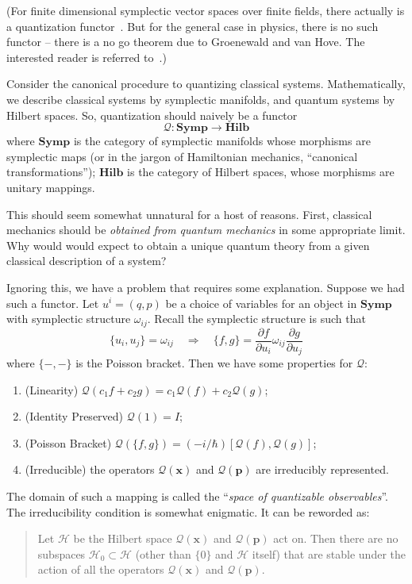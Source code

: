 (For finite dimensional symplectic vector spaces over finite
fields, there actually is a quantization
functor~\cite{gurevich-2007}. But for the general case in
physics, there is no such functor -- there is a no go theorem due
to Groenewald and van Hove. The interested reader is referred to~\cite{ali-2005-17,gotay-1996-6}.)

Consider the canonical procedure to quantizing classical
systems. Mathematically, we describe classical systems by
symplectic manifolds, and quantum systems by Hilbert spaces. So,
quantization should naively be a functor
\begin{equation}%
\mathcal{Q}:\mathbf{Symp}\to\mathbf{Hilb}
\end{equation}
where $\mathbf{Symp}$ is the category of symplectic manifolds whose
morphisms are symplectic maps (or in the jargon of Hamiltonian
mechanics, ``canonical transformations''); $\mathbf{Hilb}$ is the
category of Hilbert spaces, whose morphisms are unitary mappings.

This should seem somewhat unnatural for a host of reasons. First,
classical mechanics should be \emph{obtained from quantum mechanics} 
in some appropriate limit. Why would would expect to obtain a
unique quantum theory from a given classical description of a
system? 

Ignoring this, we have a problem that requires some
explanation. Suppose we had such a functor. Let $u^{i}=(q,p)$ be
a choice of variables for an object in $\mathbf{Symp}$ with
symplectic structure $\omega_{ij}$. Recall the symplectic
structure is such that
\begin{equation}%
\{u_i,u_j\}=\omega_{ij}\quad
\Rightarrow\quad\{f,g\}=\frac{\partial f}{\partial
  u_i}\omega_{ij}\frac{\partial g}{\partial u_{j}}
\end{equation}
where $\{-,-\}$ is the Poisson bracket. Then we have some
properties for $\mathcal{Q}$:
\begin{enumerate}
\item{(Linearity)} $\mathcal{Q}(c_{1}f+c_{2}g)=c_{1}\mathcal{Q}(f)+c_{2}\mathcal{Q}(g)$;
\item{(Identity Preserved)} $\mathcal{Q}(1)=I$;
\item{(Poisson Bracket)} $\displaystyle\mathcal{Q}\left(\{f,g\}\right)=(-i/\hbar)[\mathcal{Q}(f),\mathcal{Q}(g)]$;
\item{(Irreducible)} the operators
  $\mathcal{Q}(\mathbf{x})$ and $\mathcal{Q}(\mathbf{p})$ are
  irreducibly represented.
\end{enumerate}
The domain of such a mapping is called the ``\emph{space of quantizable observables}''.
The irreducibility condition is somewhat enigmatic. It can be
reworded as:
\begin{quote}
Let $\mathcal{H}$ be the Hilbert space $\mathcal{Q}(\mathbf{x})$
and $\mathcal{Q}(\mathbf{p})$ act on. Then there are no subspaces
$\mathcal{H}_{0}\subset\mathcal{H}$ (other than $\{0\}$ and
$\mathcal{H}$ itself) that are stable under the action of all the
operators $\mathcal{Q}(\mathbf{x})$ and $\mathcal{Q}(\mathbf{p})$.
\end{quote}

